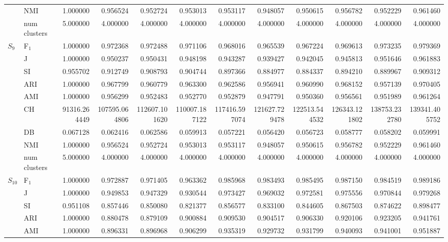 \begin{tabular}{llrrrrrrrrrr}
 & NMI & 1.000000 & 0.956524 & 0.952724 & 0.953013 & 0.953117 & 0.948057 & 0.950615 & 0.956782 & 0.952229 & 0.961460 \\
 & num clusters & 5.000000 & 4.000000 & 4.000000 & 4.000000 & 4.000000 & 4.000000 & 4.000000 & 4.000000 & 4.000000 & 4.000000 \\
\multirow[c]{9}{*}{$S_{9}$} & F$_1$ & 1.000000 & 0.972368 & 0.972488 & 0.971106 & 0.968016 & 0.965539 & 0.967224 & 0.969613 & 0.973235 & 0.979369 \\
 & J & 1.000000 & 0.950237 & 0.950431 & 0.948198 & 0.943287 & 0.939427 & 0.942045 & 0.945813 & 0.951646 & 0.961883 \\
 & SI & 0.955702 & 0.912749 & 0.908793 & 0.904744 & 0.897366 & 0.884977 & 0.884337 & 0.894210 & 0.889967 & 0.909312 \\
 & ARI & 1.000000 & 0.967799 & 0.960779 & 0.963300 & 0.962586 & 0.956941 & 0.960990 & 0.968152 & 0.957139 & 0.970405 \\
 & AMI & 1.000000 & 0.956299 & 0.952483 & 0.952770 & 0.952879 & 0.947791 & 0.950360 & 0.956561 & 0.951989 & 0.961264 \\
 & CH & 91316.264449 & 107595.064806 & 112607.101620 & 110007.187122 & 117416.597074 & 121627.729478 & 122513.544532 & 126343.121802 & 138753.232780 & 139341.405752 \\
 & DB & 0.067128 & 0.062416 & 0.062586 & 0.059913 & 0.057221 & 0.056420 & 0.056723 & 0.058777 & 0.058202 & 0.059991 \\
 & NMI & 1.000000 & 0.956524 & 0.952724 & 0.953013 & 0.953117 & 0.948057 & 0.950615 & 0.956782 & 0.952229 & 0.961460 \\
 & num clusters & 5.000000 & 4.000000 & 4.000000 & 4.000000 & 4.000000 & 4.000000 & 4.000000 & 4.000000 & 4.000000 & 4.000000 \\
\multirow[c]{9}{*}{$S_{10}$} & F$_1$ & 1.000000 & 0.972887 & 0.971405 & 0.963362 & 0.985968 & 0.983493 & 0.985495 & 0.987150 & 0.984519 & 0.989186 \\
 & J & 1.000000 & 0.949853 & 0.947329 & 0.930544 & 0.973427 & 0.969032 & 0.972581 & 0.975556 & 0.970844 & 0.979268 \\
 & SI & 0.951108 & 0.857446 & 0.850080 & 0.821377 & 0.856577 & 0.833100 & 0.844605 & 0.867503 & 0.874622 & 0.898477 \\
 & ARI & 1.000000 & 0.880478 & 0.879109 & 0.900884 & 0.909530 & 0.904517 & 0.906330 & 0.920106 & 0.923205 & 0.941761 \\
 & AMI & 1.000000 & 0.896331 & 0.896968 & 0.906299 & 0.935319 & 0.929732 & 0.931799 & 0.940093 & 0.941001 & 0.951887 \\

\end{tabular}
